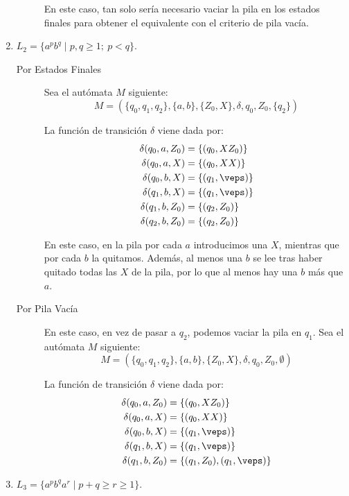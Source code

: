 \begin{ejercicio}
\begin{enumerate}
\begin{description}
            En este caso, tan solo sería necesario vaciar la pila en los estados finales para obtener el equivalente con el criterio de pila vacía.
        \end{description}
        \item $L_2 = \{a^pb^q \mid p,q\geq 1;\ p<q\}$.
        \begin{description}
            \item[Por Estados Finales] Sea el autómata $M$ siguiente:
            $$M = (\{q_0,q_1,q_2\},\{a,b\},\{Z_0,X\},\delta,q_0,Z_0,\{q_2\})$$

            La función de transición $\delta$ viene dada por:
            \begin{align*}
                \delta(q_0,a,Z_0) &= \{(q_0,XZ_0)\} \\
                \delta(q_0,a,X) &= \{(q_0,XX)\} \\
                \delta(q_0,b,X) &= \{(q_1,\veps)\} \\
                \delta(q_1,b,X) &= \{(q_1,\veps)\} \\
                \delta(q_1,b,Z_0) &= \{(q_2,Z_0)\}\\
                \delta(q_2,b,Z_0) &= \{(q_2,Z_0)\}
            \end{align*}

            En este caso, en la pila por cada $a$ introducimos una $X$, mientras que por cada $b$ la quitamos. Además, al menos una $b$ se lee tras haber quitado todas las $X$ de la pila, por lo que al menos hay una $b$ más que $a$.

            \item[Por Pila Vacía] En este caso, en vez de pasar a $q_2$, podemos vaciar la pila en $q_1$.
            Sea el autómata $M$ siguiente:
            $$M = (\{q_0,q_1,q_2\},\{a,b\},\{Z_0,X\},\delta,q_0,Z_0,\emptyset)$$

            La función de transición $\delta$ viene dada por:
            \begin{align*}
                \delta(q_0,a,Z_0) &= \{(q_0,XZ_0)\} \\
                \delta(q_0,a,X) &= \{(q_0,XX)\} \\
                \delta(q_0,b,X) &= \{(q_1,\veps)\} \\
                \delta(q_1,b,X) &= \{(q_1,\veps)\} \\
                \delta(q_1,b,Z_0) &= \{(q_1,Z_0),(q_1,\veps)\}
            \end{align*}
        \end{description}
        \item $L_3 = \{a^pb^qa^r \mid p+q\geq r\geq 1\}$.
        

\end{enumerate}
\end{ejercicio}
